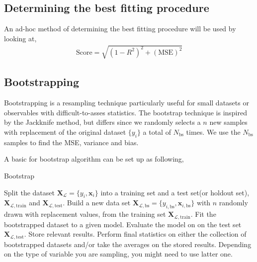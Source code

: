 \documentclass[11pt]{article}
\begin{document}
\subsection{Determining the best fitting procedure}
An ad-hoc method of determining the best fitting procedure will be used by looking at,
\begin{align}
    \mathrm{Score} = \sqrt{(1-R^2)^2 + (\mathrm{MSE})^2}
    \label{eq:opt_fit}
\end{align}

\subsection{Bootstrapping}
Bootstrapping is a resampling technique particularly useful for small datasets or observables with difficult-to-asses statistics\cite{efron1994introduction}. The bootstrap technique is inspired by the Jackknife method\cite{efron1981}, but differs since we randomly selects a $n$ new samples with replacement of the original dataset $\{y_i\}$ a total of $N_\mathrm{bs}$ times. We use the $N_\mathrm{bs}$ samples to find the MSE, variance and bias. 

A basic for bootstrap algorithm can be set up as following,
\begin{algorithm}[H]
    \caption{Bootstrap}
    \label{alg:bootstrap}
    \begin{algorithmic}[1]
        \State Split the dataset $\bm{X}_{\mathcal{L}}=\{y_i,\bm{x}_i\}$ into a training set and a test set(or holdout set), $\bm{X}_{\mathcal{L},\mathrm{train}}$ and $\bm{X}_{\mathcal{L},\mathrm{test}}$.
            \State Build a new data set $\bm{X}_{\mathcal{L},\mathrm{bs}}=\{y_{i,\mathrm{bs}},\bm{x}_{i,\mathrm{bs}}\}$ with $n$ randomly drawn with replacement values, from the training set $\bm{X}_{\mathcal{L},\mathrm{train}}$.
            \State Fit the bootstrapped dataset to a given model.
            \State Evaluate the model on on the test set $\bm{X}_{\mathcal{L},\mathrm{test}}$.
            \State Store relevant results.
        \EndFor
        \State Perform final statistics on either the collection of bootstrapped datasets and/or take the averages on the stored results. Depending on the type of variable you are sampling, you might need to use latter one.
    \end{algorithmic}
\end{algorithm}
\end{document}
